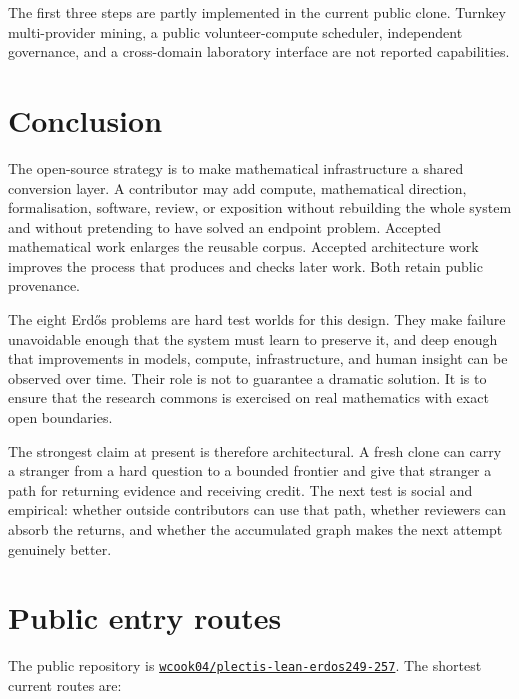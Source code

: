 \documentclass[10pt]{article}
\newcommand{\repobase}{https://github.com/wcook04/plectis-lean-erdos249-257}
\begin{document}
The first three steps are partly implemented in the current public clone.
Turnkey multi-provider mining, a public volunteer-compute scheduler,
independent governance, and a cross-domain laboratory interface are not
reported capabilities.

\section{Conclusion}\label{sec:conclusion}

The open-source strategy is to make mathematical infrastructure a shared
conversion layer.  A contributor may add compute, mathematical direction,
formalisation, software, review, or exposition without rebuilding the whole
system and without pretending to have solved an endpoint problem.  Accepted
mathematical work enlarges the reusable corpus.  Accepted architecture work
improves the process that produces and checks later work.  Both retain public
provenance.

The eight Erd\H{o}s problems are hard test worlds for this design.  They make
failure unavoidable enough that the system must learn to preserve it, and
deep enough that improvements in models, compute, infrastructure, and human
insight can be observed over time.  Their role is not to guarantee a dramatic
solution.  It is to ensure that the research commons is exercised on real
mathematics with exact open boundaries.

The strongest claim at present is therefore architectural.  A fresh clone can
carry a stranger from a hard question to a bounded frontier and give that
stranger a path for returning evidence and receiving credit.  The next test is
social and empirical: whether outside contributors can use that path, whether
reviewers can absorb the returns, and whether the accumulated graph makes the
next attempt genuinely better.

\appendix
\section{Public entry routes}\label{app:routes}

The public repository is \href{\repobase}{\texttt{wcook04/plectis-lean-erdos249-257}}.
The shortest current routes are:
\end{document}

